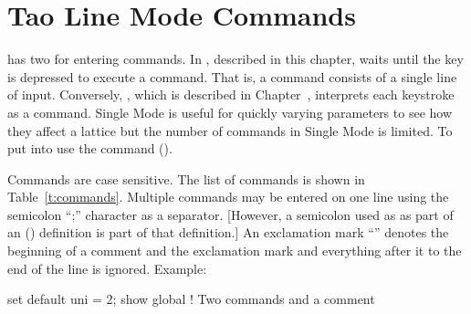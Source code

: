 \chapter{Tao Line Mode Commands}
\label{c:command}

\tao has two  for entering commands. In ,
described in this chapter, \tao waits until the  key is
depressed to execute a command. That is, a command consists of a
single line of input. Conversely, , which is described
in Chapter~, interprets each keystroke as a
command. Single Mode is useful for quickly varying parameters to see
how they affect a lattice but the number of commands in Single Mode is
limited. To put \tao into  use the 
command ().

Commands are case sensitive. The list of commands is shown in
Table~\ref{t:commands}. Multiple commands may be entered on one line
using the semicolon ``;'' character as a separator.  [However, a
semicolon used as as part of an  () definition
is part of that definition.]
An exclamation mark ``\vn{!}'' denotes the beginning of
a comment and the exclamation mark and everything after it to the end
of the line is ignored.  Example:
\begin{example}
  set default uni = 2; show global  ! Two commands and a comment
\end{example}


